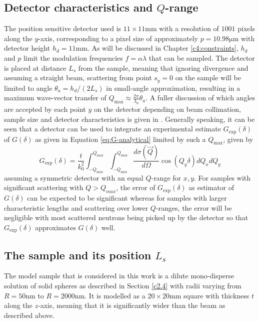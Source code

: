 \documentclass{article}
\begin{document}
\subsection{Detector characteristics and $Q$-range}
\label{c3.4}
The position sensitive detector used is $11\times11\unit{\milli\meter}$ with a resolution of $1001$ pixels along the $y$-axis, corresponding to a pixel size of approximately $p = 10.98\unit{\micro\meter}$ with detector height $h_d = 11\unit{\milli\meter}$. As will be discussed in Chapter \ref{c4:constraints}, $h_d$ and $p$ limit the modulation frequencies $f = \alpha\lambda$ that can be sampled. The detector is placed at distance $L_s$ from the sample, meaning that ignoring divergence and assuming a straight beam, scattering from point $s_y = 0$ on the sample will be limited to angle $\theta_a = h_d/(2L_s)$ in small-angle approximation, resulting in a maximum wave-vector transfer of $Q_\text{max} \approx \frac{2\pi}{\lambda_0}\theta_a$. A fuller discussion of which angles are accepted by each point $y$ on the detector depending on beam collimation, sample size and detector characteristics is given in \cite{kusmin2017}. Generally speaking, it can be seen that a detector can be used to integrate an experimental estimate $G_\text{exp}(\delta)$ of $G(\delta)$ as given in Equation \eqref{eq:G-analytical} limited by such a $Q_\text{max}$, given by 
\begin{equation}
	G_\text{exp}(\delta) = \frac{t}{k_0^2}\int_{-Q_\text{max}}^{Q_\text{max}}\int_{-Q_\text{max}}^{Q_\text{max}}\dfrac{d\sigma(\vec{Q})}{d\Omega}\cos(Q_y \delta)dQ_xdQ_y  \label{eq:G-experimental}
\end{equation}
assuming a symmetric detector with an equal $Q$-range for $x,y$. For samples with significant scattering with $Q > Q_{max}$, the error of $G_\text{exp}(\delta)$ as estimator of $G(\delta)$ can be expected to be significant whereas for samples with larger characteristic lengths and scattering over lower $Q$-ranges, the error will be negligible with most scattered neutrons being picked up by the detector \cite{rekveldt1996} so that $G_\text{exp}(\delta)$ approximates $G(\delta)$ well. 

\subsection{The sample and its position $L_s$}
\label{c3.5}
The model sample that is considered in this work is a dilute mono-disperse solution of solid spheres as described in Section \ref{c2.4} with radii varying from $R = 50\unit{\nano\meter}$ to $R = 2000\unit{\nano\meter}$. It is modelled as a $20\times20\unit{\milli\meter}$ square with thickness $t$ along the $z$-axis, meaning that it is significantly wider than the beam as described above. 
 
\end{document}
